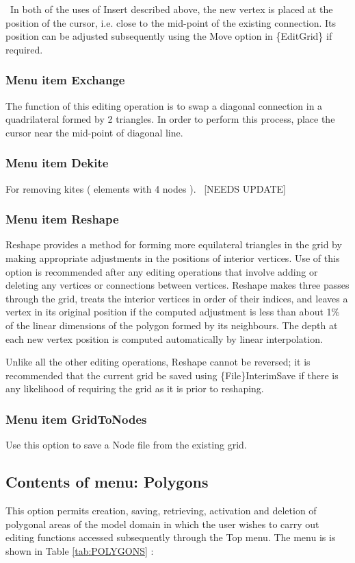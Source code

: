 \documentclass{article}
\begin{document}
\ In both of the uses of Insert described above, the new vertex is placed at the position of the cursor, i.e. close to the mid-point of the existing connection. Its position can be adjusted subsequently using the Move option in \{EditGrid\} if required.

\subsubsection[Menu item Exchange]{Menu item Exchange}
The function of this editing operation is to swap a diagonal connection in a quadrilateral formed by 2 triangles. In order to perform this process, place the cursor near the mid-point of diagonal line.

\subsubsection[Menu item Dekite]{Menu item Dekite}
For removing kites ( elements with 4 nodes ).
\
[NEEDS UPDATE]

\subsubsection[Menu item Reshape]{Menu item Reshape}
Reshape provides a method for forming more equilateral triangles in the grid by making appropriate adjustments in the positions of interior vertices. Use of this option is recommended after any editing operations that involve adding or deleting any vertices or connections between vertices. Reshape makes three passes through the grid, treats the interior vertices in order of their indices, and leaves a vertex in its original position if the computed adjustment is less than about 1\% of the linear dimensions of the polygon formed by its neighbours. The depth at each new vertex position is computed automatically by linear interpolation.

Unlike all the other editing operations, Reshape cannot be reversed; it is recommended that the current grid be saved using \{File\}InterimSave if there is any likelihood of requiring the grid as it is prior to reshaping.

\subsubsection[Menu item GridToNodes]{Menu item GridToNodes}
Use this option to save a Node file from the existing grid.




\subsection{Contents of menu: Polygons}
This option permits creation, saving, retrieving, activation and deletion of polygonal areas of the model domain in which the user wishes to carry out editing functions accessed subsequently through the Top menu. The menu is is shown in Table \ref{tab:POLYGONS} :
\end{document}
